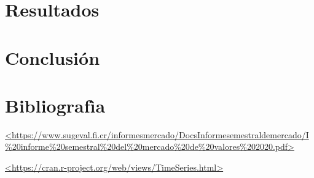 \documentclass[
]{article}
\begin{document}
\hypertarget{resultados}{%
\section{Resultados}\label{resultados}}

\hypertarget{conclusiuxf3n}{%
\section{Conclusión}\label{conclusiuxf3n}}

\hypertarget{bibliografuxeca}{%
\section{Bibliografìa}\label{bibliografuxeca}}

\href{https://www.sugeval.fi.cr/informesmercado/DocsInformesemestraldemercado/I\%20informe\%20semestral\%20del\%20mercado\%20de\%20valores\%202020.pdf}{\textless https://www.sugeval.fi.cr/informesmercado/DocsInformesemestraldemercado/I\%20informe\%20semestral\%20del\%20mercado\%20de\%20valores\%202020.pdf\textgreater{}}

\href{https://cran.r-project.org/web/views/TimeSeries.html}{\textless https://cran.r-project.org/web/views/TimeSeries.html\textgreater{}}

\newpage

\printbibliography
\end{document}
